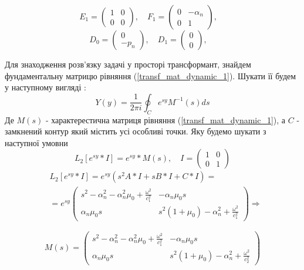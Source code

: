 \begin{equation*}
    E_1 = \begin{pmatrix}
        1 & 0 \\
        0 & 0
    \end{pmatrix}, \quad
    F_1 = \begin{pmatrix}
        0 & -\alpha_n \\
        0 & 1
    \end{pmatrix}, \quad
\end{equation*}
\begin{equation*}
    D_0 = \begin{pmatrix}
        0 \\
        -p_n
    \end{pmatrix}, \quad
    D_1 = \begin{pmatrix}
        0 \\
        0
    \end{pmatrix}, \quad
\end{equation*}

Для знаходження розв'язку задачі у просторі трансформант, знайдем фундаментальну матрицю рівняння (\ref{transf_mat_dynamic_1}).
Шукати її будем у наступному вигляді \cite{gantmaher}:
\begin{equation}
    Y(y) = \frac{1}{2\pi i} \oint_C e^{sy} M^{-1}(s)ds
\end{equation}
Де $M(s)$ - характерестична матриця рівняння (\ref{transf_mat_dynamic_1}), а $C$ - замкнений контур який містить усі особливі точки. Яку будемо шукати з наступної умовни
\begin{equation}
    L_2\left[ e^{sy}*I \right] = e^{sy} * M(s), \quad I = \begin{pmatrix} 1 & 0 \\ 0 & 1 \end{pmatrix}
\end{equation}
\begin{align*}
    &L_2\left[ e^{sy}*I \right] = e^{sy} \left( s^2A * I + s B*I + C*I \right) = \\
    &=e^{sy} \begin{pmatrix}
        s^2 - \alpha_n^2 - \alpha_n^2\mu_0 + \frac{\omega^2}{c_1^2} & -\alpha_n \mu_0 s \\
        \alpha_n \mu_0 s & s^2 (1 + \mu_0) -\alpha_n^2 + \frac{\omega^2}{c_1^2}
     \end{pmatrix} \Rightarrow
\end{align*}

\begin{equation}
    M(s) = \begin{pmatrix}
        s^2 - \alpha_n^2 - \alpha_n^2\mu_0 + \frac{\omega^2}{c_1^2} & -\alpha_n \mu_0 s \\
        \alpha_n \mu_0 s & s^2 (1 + \mu_0) -\alpha_n^2 + \frac{\omega^2}{c_2^2}
     \end{pmatrix}
\end{equation}

